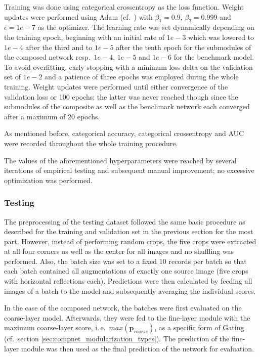 Training was done using categorical crossentropy as the loss function. Weight updates were performed using Adam (cf.\ \cite{Kingma2014-db}) with $\beta_1 = 0.9$, $\beta_2 = 0.999$ and $\epsilon = 1e-7$ as the optimizer. The learning rate was set dynamically depending on the training epoch, beginning with an initial rate of $1e-3$ which was lowered to $1e-4$ after the third and to $1e-5$ after the tenth epoch for the submodules of the composed network resp.~$1e-4$, $1e-5$ and $1e-6$ for the benchmark model. To avoid overfitting, early stopping with a minimum loss delta on the validation set of $1e-2$ and a patience of three epochs was employed during the whole training. Weight updates were performed until either convergence of the validation loss or 100 epochs; the latter was never reached though since the submodules of the composite as well as the benchmark network each converged after a maximum of 20 epochs.

As mentioned before, categorical accuracy, categorical crossentropy and AUC were recorded throughout the whole training procedure.

The values of the aforementioned hyperparameters were reached by several iterations of empirical testing and subsequent manual improvement; no excessive optimization was performed.

\subsubsection{Testing%
               \label{sec:experiments_cifar100_testing}}
               
The preprocessing of the testing dataset followed the same basic procedure as described for the training and validation set in the previous section for the most part. However, instead of performing random crops, the five crops were extracted at all four corners as well as the center for all images and no shuffling was performed. Also, the batch size was set to a fixed 10 records per batch so that each batch contained all augmentations of exactly one source image (five crops with horizontal reflections each). Predictions were then calculated by feeding all images of a batch to the model and subsequently averaging the individual scores.

In the case of the composed network, the batches were first evaluated on the coarse-layer model. Afterwards, they were fed to the fine-layer module with the maximum coarse-layer score, i.\,e.\ $max(\textbf{p}_{coarse})$, as a specific form of Gating (cf.\ section \ref{sec:compnet_modularization_types}). The prediction of the fine-layer module was then used as the final prediction of the network for evaluation.

